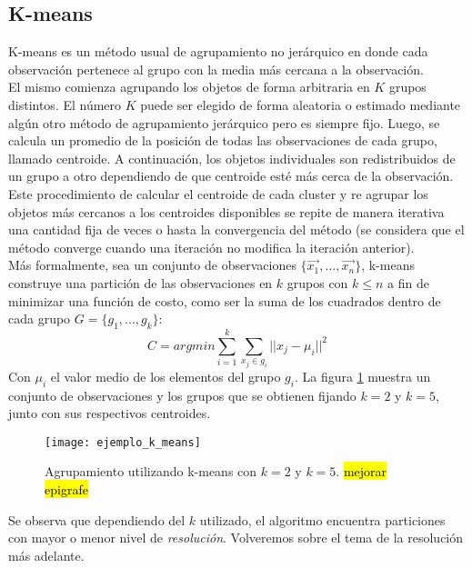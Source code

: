 \subsection{K-means}
K-means es un método usual de agrupamiento no jerárquico en donde cada observación pertenece al grupo con la media más cercana a la observación.\\
El mismo comienza agrupando los objetos de forma arbitraria en $K$ grupos distintos. El número $K$ puede ser elegido de forma aleatoria o estimado mediante algún otro método de agrupamiento jerárquico pero es siempre fijo. Luego, se calcula un promedio de la posición de todas las observaciones de cada grupo, llamado centroide. A continuación, los objetos individuales son redistribuidos de un grupo a otro dependiendo de que centroide esté más cerca de la observación. Este procedimiento de calcular el centroide de cada cluster y re agrupar los objetos más cercanos a los centroides disponibles se repite de manera iterativa una cantidad fija de veces o hasta la convergencia del método (se considera que el método converge cuando una iteración no modifica la iteración anterior).\\
Más formalmente, sea un conjunto de observaciones $\{\vec{x_1},...,\vec{x_n}\}$, k-means construye una partición de las observaciones en $k$ grupos con $k \leq n$ a fin de minimizar una función de costo, como ser la suma de los cuadrados dentro de cada grupo $G = \{g_1,...,g_k\}$: 
\begin{equation}
	C = argmin\sum\limits_{i=1}^k \sum\limits_{x_j \in g_i}||x_j-\mu_i||^2
\end{equation}
Con $\mu_i$ el valor medio de los elementos del grupo $g_i$.
La figura \ref{fig:ejemplo_k_means} muestra un conjunto de observaciones y los grupos que se obtienen fijando $k=2$ y $k=5$, junto con sus respectivos centroides.
\begin{figure}[h]
    \centering
    \texttt{[image: ejemplo\_k\_means]}
    \caption{Agrupamiento utilizando k-means con $k=2$ y $k=5$. \hl{mejorar epigrafe}}
    \label{fig:ejemplo_k_means}
\end{figure}
Se observa que dependiendo del $k$ utilizado, el algoritmo encuentra particiones con mayor o menor nivel de \textit{resolución}. Volveremos sobre el tema de la resolución más adelante.
\cite{Kogan2006, Hartigan1979}

